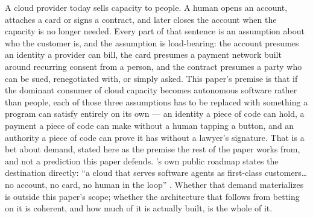 

A cloud provider today sells capacity to people. A human opens an account, attaches a card or signs
a contract, and later closes the account when the capacity is no longer needed. Every part of that
sentence is an assumption about who the customer is, and the assumption is load-bearing: the account
presumes an identity a provider can bill, the card presumes a payment network built around recurring
consent from a person, and the contract presumes a party who can be sued, renegotiated with, or
simply asked. This paper's premise is that if the dominant consumer of cloud capacity becomes
autonomous software rather than people, each of those three assumptions has to be replaced with
something a program can satisfy entirely on its own — an identity a piece of code can hold, a payment
a piece of code can make without a human tapping a button, and an authority a piece of code can prove
it has without a lawyer's signature. That is a bet about demand, stated here as the premise the rest
of the paper works from, and not a prediction this paper defends. \Flux's own public roadmap states
the destination directly: ``a cloud that serves software agents as first-class customers\ldots no
account, no card, no human in the loop'' \vision {}. Whether that
demand materializes is outside this paper's scope; whether the architecture that follows from betting
on it is coherent, and how much of it is actually built, is the whole of it.

